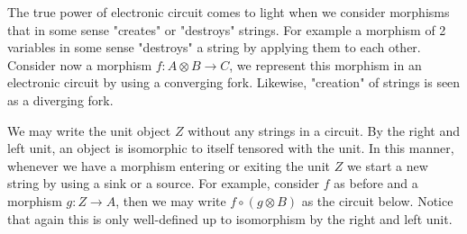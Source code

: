 \documentclass[../thesis.tex]{subfiles}
\begin{document}
            The true power of electronic circuit comes to light when we consider morphisms that in some sense "creates" or "destroys" strings. For example a morphism of 2 variables in some sense "destroys" a string by applying them to each other. Consider now a morphism $f : A \otimes B \rightarrow C$, we represent this morphism in an electronic circuit by using a converging fork. Likewise, "creation" of strings is seen as a diverging fork.
            \begin{center}
            \end{center}

            We may write the unit object $Z$ without any strings in a circuit. By the right and left unit, an object is isomorphic to itself tensored with the unit. In this manner, whenever we have a morphism entering or exiting the unit $Z$ we start a new string by using a sink or a source. For example, consider $f$ as before and a morphism $g : Z \rightarrow A$, then we may write $f \circ (g \otimes B)$ as the circuit below. Notice that again this is only well-defined up to isomorphism by the right and left unit.
            \begin{center}
            \end{center}
\end{document}
